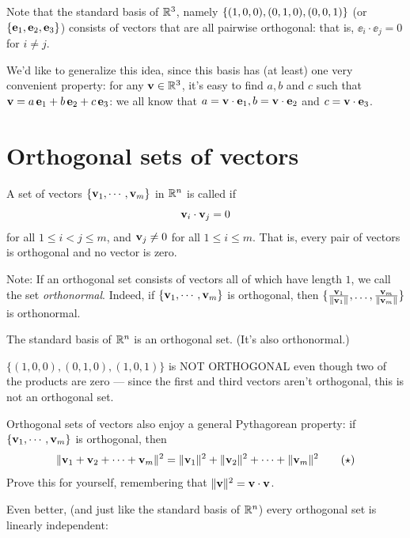 Note that the standard basis of $\mathbb{R}^3$, namely $\{(1,0,0), (0,1,0), (0,0,1) \}$ (or $\{\mathbf{e}_1, \mathbf{e}_2, \mathbf{e}_3 \}$) consists of vectors that are all pairwise orthogonal:  that is, 
$
\ee_i \cdot \ee_j = 0
$ for $ i\not=j$.

 We'd like to generalize this idea, since this basis has (at least) one very convenient property: for any $\mathbf{v} \in \mathbb{R}^3$, it's easy to find $a,b$ and $c$ such that $\mathbf{v}= a \,\mathbf{e}_1 +b\,\mathbf{e}_2+ c\,\mathbf{e}_3$: we all know that $a=\mathbf{v}\cdot \mathbf{e}_1, b=\mathbf{v}\cdot \mathbf{e}_2$ and $c=\mathbf{v}\cdot \mathbf{e}_3$.


\section{Orthogonal sets of vectors}


\begin{definition}
A set of vectors $\{\mathbf{v}_1, \cdots, \mathbf{v}_m\}$ in $\mathbb{R}^n$ is called   if
 $$
\mathbf{v}_i \cdot \mathbf{v}_j = 0
$$
for all $1 \leq i < j \leq m$, and $\mathbf{v}_j\not=0$ for  all $1 \leq i  \leq m$. That is, every pair of vectors is orthogonal and no vector is zero.
\end{definition}

Note: If an orthogonal set consists of vectors all of which have length $1$, we call the set {\it orthonormal}. Indeed, if $\{\mathbf{v}_1, \cdots, \mathbf{v}_m\}$  is  orthogonal, then 
$\{\frac{\mathbf{v}_1}{\|\mathbf{v}_1\|}, \dots, \frac{\mathbf{v}_m}{\|\mathbf{v}_m\|}\}$ is orthonormal.


\begin{myexample} The standard basis of $\mathbb{R}^n$ is an orthogonal set. (It's also orthonormal.)\end{myexample}

\begin{myexample} $\{ (1,0,0), (0,1,0), (1,0,1)\}$ is NOT ORTHOGONAL even though two of the
products are zero --- since the first and third vectors aren't orthogonal, this
is not an orthogonal set. \end{myexample}

Orthogonal sets of vectors also enjoy a general Pythagorean property: if $\{\mathbf{v}_1, \cdots, \mathbf{v}_m\}$ is orthogonal, then 
\begin{equation*} \|\mathbf{v}_1 + \mathbf{v}_2 +\cdots + \mathbf{v}_m\|^2 =\|\mathbf{v}_1\|^2 + \|\mathbf{v}_2\|^2 +\cdots + \|\mathbf{v}_m\|^2 \tag{$\star$}\label{eqn:Pythag}
\end{equation*}
Prove this for yourself, remembering that $\|\mathbf{v}\|^2= \mathbf{v}\cdot \mathbf{v}$.

Even better, (and just like the standard basis of $\mathbb{R}^n$) every orthogonal set is linearly independent:

